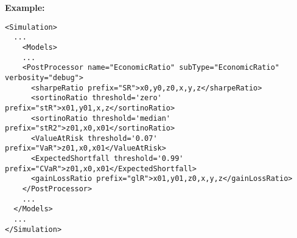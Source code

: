 \textbf{Example:}
\begin{lstlisting}[style=XML,morekeywords={name,subType,class,type,steps}]
<Simulation>
  ...
    <Models>
    ...
    <PostProcessor name="EconomicRatio" subType="EconomicRatio" verbosity="debug">
      <sharpeRatio prefix="SR">x0,y0,z0,x,y,z</sharpeRatio>
      <sortinoRatio threshold='zero' prefix="stR">x01,y01,x,z</sortinoRatio>
      <sortinoRatio threshold='median' prefix="stR2">z01,x0,x01</sortinoRatio>
      <ValueAtRisk threshold='0.07' prefix="VaR">z01,x0,x01</ValueAtRisk>
      <ExpectedShortfall threshold='0.99' prefix="CVaR">z01,x0,x01</ExpectedShortfall>
      <gainLossRatio prefix="glR">x01,y01,z0,x,y,z</gainLossRatio>
    </PostProcessor>  
    ...
  </Models>
  ...
</Simulation>
\end{lstlisting}